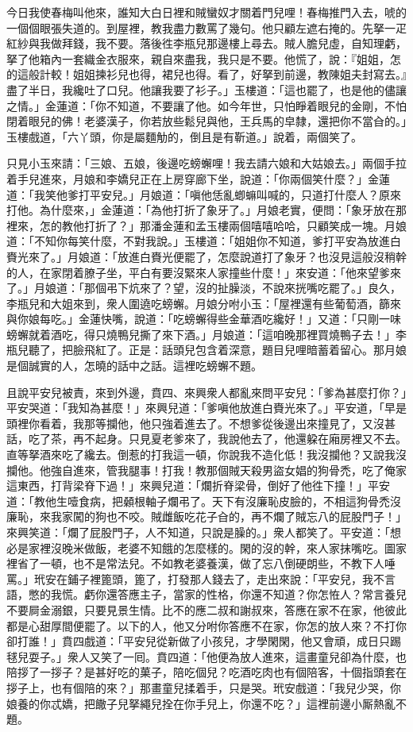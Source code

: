 今日我使春梅叫他來，誰知大白日裡和賊蠻奴才關着門兒哩！春梅推門入去，唬的一個個眼張失道的。{}到屋裡，教我盡力數罵了幾句。他只顧左遮右掩的。先拏一疋紅紗與我做拜錢，我不要。落後徃李瓶兒那邊樓上尋去。賊人膽兒虛，自知理虧，拏了他箱內一套織金衣服來，親自來盡我，我只是不要。他慌了，說：『姐姐，怎的這般計較！姐姐揀衫兒也得，裙兒也得。看了，好拏到前邊，教陳姐夫封寫去。』盡了半日，我纔吐了口兒。他讓我要了衫子。」玉樓道：「這也罷了，也是他的儘讓之情。」金蓮道：「你不知道，不要讓了他。如今年世，只怕睜着眼兒的金剛，不怕閉着眼兒的佛！老婆漢子，你若放些鬆兒與他，王兵馬的皁隸，還把你不當㒲的。」玉樓戲道，「六丫頭，你是屬麵觔的，倒且是有靳道。」說着，兩個笑了。

只見小玉來請：「三娘、五娘，後邊吃螃蠏哩！我去請六娘和大姑娘去。」兩個手拉着手兒進來，月娘和李嬌兒正在上房穿廊下坐，說道：「你兩個笑什麼？」金蓮道：「我笑他爹打平安兒。」月娘道：「嗔他恁亂蝍䗫叫喊的，只道打什麼人？原來打他。為什麼來，」金蓮道：「為他打折了象牙了。」月娘老實，便問：「象牙放在那裡來，怎的教他打折了？」那潘金蓮和孟玉樓兩個嘻嘻哈哈，只顧笑成一塊。月娘道：「不知你每笑什麼，不對我說。」玉樓道：「姐姐你不知道，爹打平安為放進白賚光來了。」月娘道：「放進白賚光便罷了，怎麼說道打了象牙？也沒見這般沒稍幹的人，在家閉着膫子坐，平白有要沒緊來人家撞些什麼！」來安道：「他來望爹來了。」月娘道：「那個弔下炕來了？望，沒的扯臊淡，不說來挄嘴吃罷了。」良久，李瓶兒和大姐來到，衆人圍遶吃螃蠏。月娘分咐小玉：「屋裡還有些葡萄酒，篩來與你娘每吃。」金蓮快嘴，說道：「吃螃蠏得些金華酒吃纔好！」又道：「只剛一味螃蠏就着酒吃，得只燒鴨兒撕了來下酒。」月娘道：「這咱晚那裡買燒鴨子去！」李瓶兒聽了，把臉飛紅了。正是：話頭兒包含着深意，題目兒哩暗蓄着留心。那月娘是個誠實的人，怎曉的話中之話。這裡吃螃蠏不題。

且說平安兒被責，來到外邊，賁四、來興衆人都亂來問平安兒：「爹為甚麼打你？」平安哭道：「我知為甚麼！」來興兒道：「爹嗔他放進白賚光來了。」平安道，「早是頭裡你看着，我那等攔他，他只強着進去了。不想爹從後邊出來撞見了，又沒甚話，吃了茶，再不起身。只見夏老爹來了，我說他去了，他還躱在廂房裡又不去。直等拏酒來吃了纔去。倒惹的打我這一頓，你說我不造化低！我沒攔他？又說我沒攔他。他強自進來，管我腿事！打我！教那個賊天殺男盜女娼的狗骨禿，吃了俺家這東西，打背梁脊下過！」來興兒道：「爛折脊梁骨，倒好了他徃下撞！」平安道：「教他生噎食病，把顙根軸子爛弔了。天下有沒廉恥皮臉的，不相這狗骨禿沒廉恥，來我家闖的狗也不咬。賊雌飯吃花子㒲的，再不爛了賊忘八的屁股門子！」來興笑道：「爛了屁股門子，人不知道，只說是臊的。」衆人都笑了。平安道：「想必是家裡沒晚米做飯，老婆不知餓的怎麼樣的。閑的沒的幹，來人家抹嘴吃。圖家裡省了一頓，也不是常法兒。不如教老婆養漢，做了忘八倒硬朗些，不教下人唾罵。」玳安在鋪子裡篦頭，篦了，打發那人錢去了，走出來說：「平安兒，我不言語，憋的我慌。虧你還答應主子，當家的性格，你還不知道？你怎恠人？常言養兒不要屙金溺銀，只要見景生情。比不的應二叔和謝叔來，答應在家不在家，他彼此都是心甜厚間便罷了。以下的人，他又分咐你答應不在家，你怎的放人來？不打你卻打誰！」賁四戲道：「平安兒從新做了小孩兒，才學閑閑，他又會頑，成日只踢毬兒耍子。」衆人又笑了一囘。賁四道：「他便為放人進來，這畫童兒卻為什麼，也陪拶了一拶子？是甚好吃的菓子，陪吃個兒？吃酒吃肉也有個陪客，十個指頭套在拶子上，也有個陪的來？」那畫童兒揉着手，只是哭。玳安戲道：「我兒少哭，你娘養的你忒嬌，把饊子兒拏繩兒拴在你手兒上，你還不吃？」這裡前邊小厮熱亂不題。

